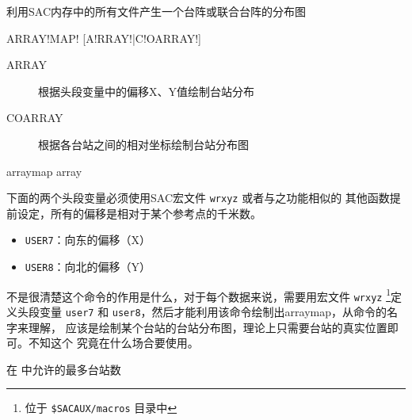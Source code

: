 \label{cmd:arraymap}

利用SAC内存中的所有文件产生一个台阵或联合台阵的分布图

\begin{SACSTX}
ARRAY!MAP! [A!RRAY!|C!OARRAY!]
\end{SACSTX}

\begin{description}
\item [ARRAY] 根据头段变量中的偏移X、Y值绘制台站分布
\item [COARRAY] 根据各台站之间的相对坐标绘制台站分布图
\end{description}

\begin{SACDFT}
arraymap array
\end{SACDFT}

下面的两个头段变量必须使用SAC宏文件 \texttt{wrxyz} 或者与之功能相似的
其他函数提前设定，所有的偏移是相对于某个参考点的千米数。
\begin{itemize}
\item \texttt{USER7}：向东的偏移（X）
\item \texttt{USER8}：向北的偏移（Y）
\end{itemize}

不是很清楚这个命令的作用是什么，对于每个数据来说，需要用宏文件 \texttt{wrxyz}
\footnote{位于 \verb|$SACAUX/macros| 目录中}定义头段变量 \texttt{user7}
和 \texttt{user8}，然后才能利用该命令绘制出arraymap，从命令的名字来理解，
应该是绘制某个台站的台站分布图，理论上只需要台站的真实位置即可。不知这个
究竟在什么场合要使用。

在  中允许的最多台站数
